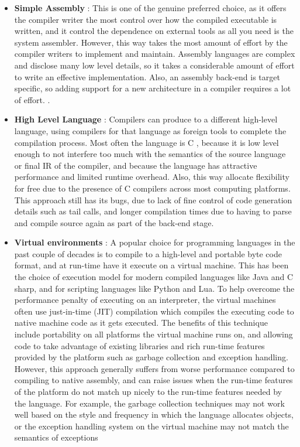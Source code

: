 \documentclass[openany]{book}
\begin{document}
	\begin{itemize}
		\item \textbf{Simple Assembly} :  This is one of the genuine preferred choice, as it offers the compiler
		writer the most control over how the compiled executable is written, and it control
		the dependence on external tools as all you need is the system assembler. However, this
		way takes the most amount of effort by the compiler writers to implement and
		maintain.  Assembly languages are complex and disclose many low level details, so
		it takes a considerable amount of effort to write an effective implementation.  Also,
		an assembly back-end is target specific, so adding support for a new architecture in a
		compiler requires a lot of effort.
		.
		\item \textbf{High Level Language} : Compilers can produce to a different high-level language, using
		compilers for that language as foreign tools to complete the compilation process.
		Most often the language is C ,  because it is low level enough to not interfere too much with the semantics of the source language or final IR of the compiler, and because the language has attractive performance and limited runtime overhead.  Also, this way allocate flexibility for free due to the presence of C compilers across most computing platforms. This approach still has its bugs, due to lack of fine control of	code generation details such as tail calls, and longer compilation times due to having	to parse and compile source again as part of the back-end stage. 
		\item \textbf{Virtual environments} : A popular choice for programming languages in the past couple of decades is to compile to a high-level and portable byte code format, and at run-time have it execute on a virtual machine. This has been the choice of execution model for modern compiled languages like Java and C sharp, and for  scripting  languages  like  Python  and  Lua.   To  help  overcome  the  performance penalty of executing on an interpreter,  the virtual machines often use just-in-time (JIT) compilation which compiles the executing code to native machine code as it gets executed. The benefits of this technique include portability on all platforms the virtual machine runs on, and allowing code to take advantage of existing libraries and rich run-time features provided by the platform such as garbage collection and exception handling.   However,  this approach generally suffers from worse performance compared to compiling to native assembly, and can raise issues when the run-time features of the platform do not match up nicely to the run-time features needed by the language.  For example, the garbage collection techniques may not work well based	on the style and frequency in which the language allocates objects, or the exception handling system on the virtual machine may not match the semantics of exceptions

\end{itemize}
\end{document}
